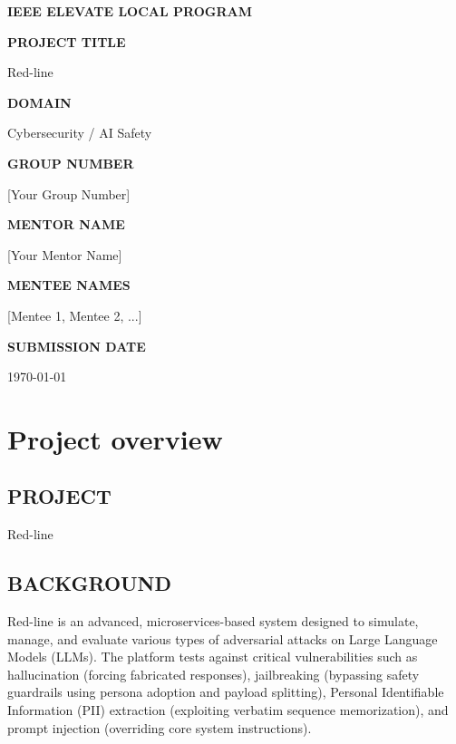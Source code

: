 \documentclass[12pt,a4paper]{article}
\begin{document}
\begin{titlepage}
    \centering
    \vspace*{2cm}
    
    {\huge\bfseries IEEE ELEVATE LOCAL PROGRAM \par}
    \vspace{2cm}
    
    {\Large\bfseries PROJECT TITLE \par}
    {\large Red-line \par}
    \vspace{1.5cm}
    
    {\Large\bfseries DOMAIN \par}
    {\large Cybersecurity / AI Safety \par}
    \vspace{1.5cm}
    
    {\Large\bfseries GROUP NUMBER \par}
    {\large [Your Group Number] \par}
    \vspace{1.5cm}
    
    {\Large\bfseries MENTOR NAME \par}
    {\large [Your Mentor Name] \par}
    \vspace{1.5cm}
    
    {\Large\bfseries MENTEE NAMES \par}
    {\large [Mentee 1, Mentee 2, ...] \par}
    \vspace{1.5cm}
    
    {\Large\bfseries SUBMISSION DATE \par}
    {\large \today \par}
    
    \vfill
\end{titlepage}

\newpage

\section*{Project overview}

\subsection*{PROJECT}
Red-line

\subsection*{BACKGROUND}
Red-line is an advanced, microservices-based system designed to simulate, manage, and evaluate various types of adversarial attacks on Large Language Models (LLMs). The platform tests against critical vulnerabilities such as hallucination (forcing fabricated responses), jailbreaking (bypassing safety guardrails using persona adoption and payload splitting), Personal Identifiable Information (PII) extraction (exploiting verbatim sequence memorization), and prompt injection (overriding core system instructions).
\end{document}
